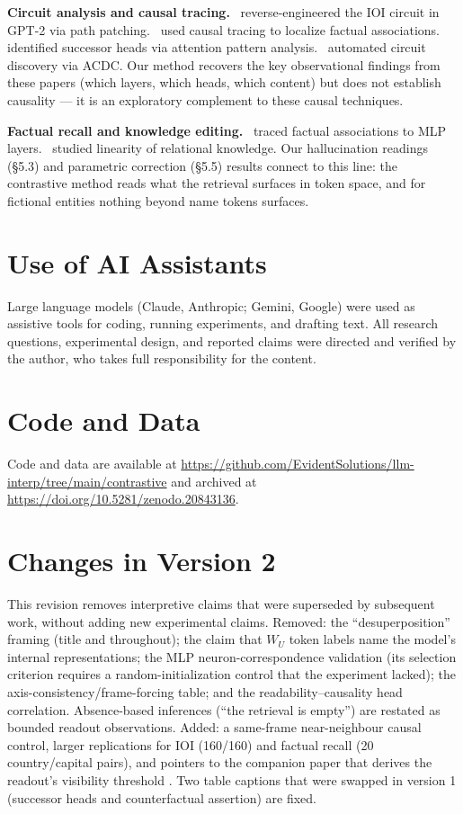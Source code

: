 \documentclass[11pt]{article}
\newcommand{\WU}{W_U}
\begin{document}
\textbf{Circuit analysis and causal tracing.}~\citet{wang2023} reverse-engineered
the IOI circuit in GPT-2 via path patching.~\citet{meng2022} used causal
tracing to localize factual associations.~\citet{gould2024} identified
successor heads via attention pattern analysis.~\citet{conmy2023} automated
circuit discovery via ACDC. Our method recovers the key observational findings
from these papers (which layers, which heads, which content) but does not
establish causality --- it is an exploratory complement to these causal
techniques.

\textbf{Factual recall and knowledge editing.}~\citet{geva2023} traced factual
associations to MLP layers.~\citet{hernandez2024} studied linearity of
relational knowledge. Our hallucination readings (\S5.3) and parametric
correction (\S5.5) results connect to this line: the contrastive method
reads what the retrieval surfaces in token space, and for fictional
entities nothing beyond name tokens surfaces.

\section*{Use of AI Assistants}

Large language models (Claude, Anthropic; Gemini, Google) were used as
assistive tools for coding, running experiments, and drafting text. All
research questions, experimental design, and reported claims were
directed and verified by the author, who takes full responsibility for
the content.

\section*{Code and Data}

Code and data are available at
\url{https://github.com/EvidentSolutions/llm-interp/tree/main/contrastive}
and archived at \url{https://doi.org/10.5281/zenodo.20843136}.

\section*{Changes in Version 2}

This revision removes interpretive claims that were superseded by
subsequent work, without adding new experimental claims. Removed: the
``desuperposition'' framing (title and throughout); the claim that $\WU$
token labels name the model's internal representations; the MLP
neuron-correspondence validation (its selection criterion requires a
random-initialization control that the experiment lacked); the
axis-consistency/frame-forcing table; and the readability--causality
head correlation. Absence-based inferences (``the retrieval is empty'')
are restated as bounded readout observations. Added: a same-frame
near-neighbour causal control, larger replications for IOI (160/160)
and factual recall (20 country/capital pairs), and pointers to the
companion paper that derives the readout's visibility threshold
\citep{tuomi2026visibility}. Two table captions that were swapped in
version 1 (successor heads and counterfactual assertion) are fixed.
\end{document}
